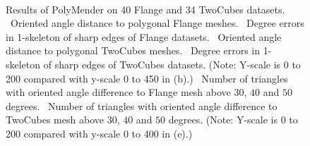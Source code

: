 \begin{figure}[p]
\quad
\\
\caption{Results of PolyMender on 40 Flange and 34 TwoCubes datasets.
\protect{}~Oriented angle distance to polygonal Flange meshes.
\protect{}~Degree errors in 1-skeleton of sharp edges of Flange datasets.
\protect{}~Oriented angle distance to polygonal TwoCubes meshes.
\protect{}~Degree errors in 1-skeleton of sharp edges of TwoCubes datasets.
(Note: Y-scale is 0 to 200 compared with y-scale 0 to 450 in (b).)
\protect{}~Number of triangles with oriented angle difference to Flange mesh 
above $30$, $40$ and $50$ degrees.
\protect{}~Number of triangles with oriented angle difference to TwoCubes mesh
above $30$, $40$ and $50$ degrees.
(Note: Y-scale is 0 to 200 compared with y-scale 0 to 400 in (e).)
}
\label{fig:polymenderA}
\end{figure}

